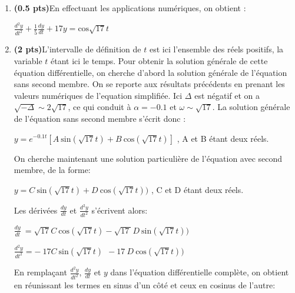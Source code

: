 \documentclass[fleqn]{article}
\begin{document}
\begin{enumerate}
\item \textbf{(0.5 pts)}{En effectuant les applications num\'eriques, on obtient :}

\begin{center}


{$\frac{d^{2}y}{dt^{2}}+\frac{1}{5} \frac{dy}{dt} +17y = \text{cos} \sqrt{17}t$}
\end{center}


\item \textbf{(2 pts)}{L'intervalle de d\'efinition de $t$ est ici l'ensemble des r\'eels positifs, la variable $t$ \'etant ici le temps.  Pour obtenir la solution g\'en\'erale de cette \'equation diff\'erentielle, on cherche d'abord la solution g\'en\'erale de l'\'equation sans second membre. On se reporte aux r\'esultats pr\'ec\'edents en prenant les valeurs num\'eriques de l'equation simplifi\'ee. Ici $\Delta$ est n\'egatif et on a $\sqrt{-\Delta} \sim 2 \sqrt{17}$, ce qui conduit \`a $\alpha =-0.1$ et $\omega \sim \sqrt{17}$. La solution g\'en\'erale de l'\'equation sans second membre s'\'ecrit donc :}
\begin{center}

{$y= e^{- 0.1t}[A\  \text{sin}(\sqrt{17} t) + B\  \text{cos} (\sqrt{17} t)]$ , A et B \'etant deux r\'eels.}
\end{center}

{On cherche maintenant une solution particuli\`ere de l'\'equation avec second membre, de la forme:}
\begin{center}

{$y= C\ \text{sin}(\sqrt{17} t) + D\  \text{cos} (\sqrt{17} t))$ , C et D \'etant deux r\'eels.}
\end{center}

{Les d\'eriv\'ees $\frac{dy}{dt}$ et $\frac{d^{2}y}{dt^{2}}$ s'\'ecrivent alors:}
\begin{center}

{ $ \frac{dy}{dt}\ = \sqrt{17} C\ \text{cos}(\sqrt{17} t) - \sqrt{17\ } D\ \text{sin} (\sqrt{17} t))$}

{$\frac{d^{2}y}{dt^{2}}= - \ 17 C\ \text{sin}(\sqrt{17} t) \ \  -17\ D\ \text{cos} (\sqrt{17} t))$}
\end{center}

{En rempla\c cant $\frac{d^{2}y}{dt^{2}}$, $\frac{dy}{dt}$ et $y$ dans l'\'equation diff\'erentielle compl\`ete, on obtient en r\'eunissant les termes en sinus d'un c\^ot\'e et ceux en cosinus de l'autre:}


\end{enumerate}
\end{document}
